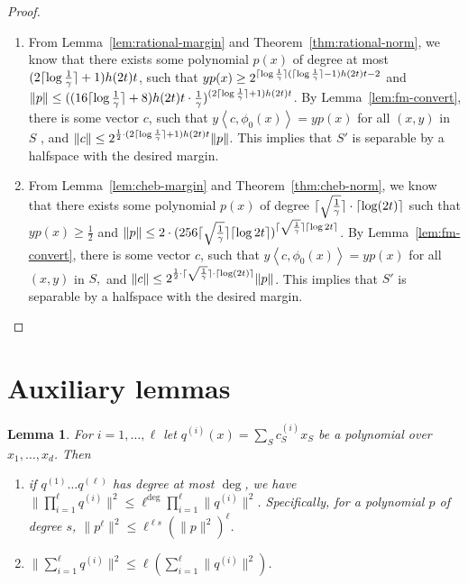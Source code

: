 \documentclass{article}
\DeclarePairedDelimiter\ceil{\lceil}{\rceil}
\newcommand{\inner}[1]{ \left\langle {#1} \right\rangle }
\newtheorem{lemma}[theorem]{Lemma}
\begin{document}
\begin{proof}
\begin{enumerate}
\item From Lemma~\ref{lem:rational-margin} and Theorem~\ref{thm:rational-norm},
we know that there exists some polynomial $p(x)$ of degree at most $(2\ceil{\log \frac 1 \gamma}+1) h(2t) t$, such that
$y p(x) \geq  2^{\ceil{\log \frac 1 \gamma}(\ceil{\log \frac 1 \gamma}-1)h(2t)t - 2}$ and
$\|p\| \leq ((16\ceil{\log \frac 1 \gamma}+8) h(2t) t \cdot \frac 1 \gamma)^{(2\ceil{\log \frac 1 \gamma}+1)h(2t)t}$.
By Lemma~\ref{lem:fm-convert}, there is some vector $c$, such that $y \inner{c, \phi_0(x)} = y p(x)$ for all $(x,y)$ in $S$	, and $\| c \| \leq 2^{\frac 1 2 \cdot (2\ceil{\log \frac 1 \gamma}+1) h(2t) t} \| p \|$.
This implies that $S'$ is separable by a halfspace with the desired margin.

\item From Lemma~\ref{lem:cheb-margin} and Theorem~\ref{thm:cheb-norm}, we know that there exists some polynomial $p(x)$ of degree $\ceil{\sqrt{\frac1\gamma}} \cdot \ceil{\log(2t)}$ such that
$y p(x) \geq \frac 1 2$ and
$\| p \| \leq 2 \cdot (256 \ceil{\sqrt{\frac1\gamma}} \ceil{\log 2t})^{\ceil{\sqrt{\frac1\gamma}} \ceil{\log 2t}}$.
By Lemma~\ref{lem:fm-convert}, there is some vector $c$, such that $y \inner{c, \phi_0(x)} = y p(x)$ for all $(x,y)$ in $S,$ and $\| c \| \leq 2^{\frac 1 2 \cdot \ceil{\sqrt{\frac1\gamma}} \cdot \ceil{\log(2t)}} \| p \|$.
This implies that $S'$ is separable by a halfspace with the desired margin.
\end{enumerate}


\end{proof}




\section{Auxiliary lemmas}
\begin{lemma}
   For $i=1,\ldots, \ell$ let $q^{(i)}(x)=\sum_S c^{(i)}_{S} x_S $ be a polynomial over $x_1, \ldots, x_d$. Then
   \begin{enumerate}
     \item if $q^{(1)}\ldots q^{(\ell)}$ has degree at most $\deg$, we have $\|\prod_{i=1}^{\ell} q^{(i)}\|^2 \leq \ell^{\deg} \prod_{i=1}^{\ell} \|q^{(i)}\|^2$. Specifically, for a polynomial $p$ of degree $s$, $\|p^\ell \|^2 \leq  \ell^{\ell s} (\|p\|^2)^\ell$.
     \item $\|\sum_{i=1}^{\ell} q^{(i)}\|^2 \leq \ell(\sum_{i=1}^{\ell} \|q^{(i)}\|^2)$.
   \end{enumerate}
   \label{lem:norm-oper}
\end{lemma}



\newpage


\end{document}
